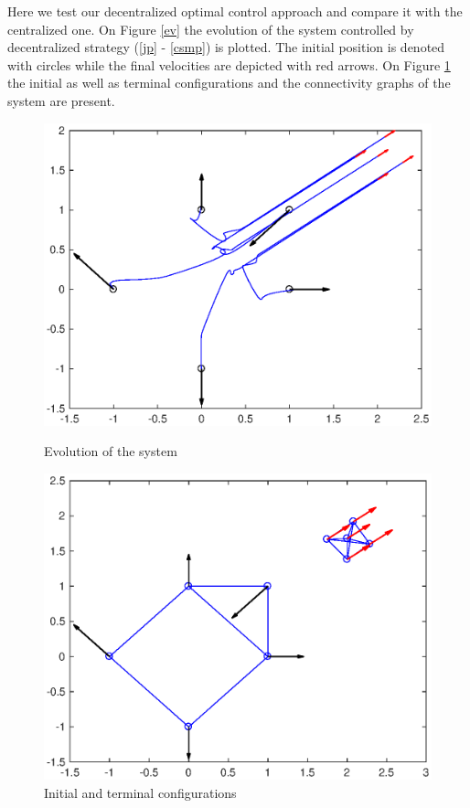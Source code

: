 \documentclass[a4paper,10pt, english]{article}
\begin{document}
Here we test our decentralized optimal control approach and compare it with the centralized one. 
On Figure \ref{ev} the evolution of the system  controlled by decentralized strategy (\ref{jp} - \ref{csmp}) is plotted. The initial position
is denoted with circles while the final velocities are depicted with red arrows. On Figure \ref{g} the initial as well as terminal configurations and the connectivity graphs of the system are present.



\begin{figure}[ht]
  \begin{minipage}[b]{0.5\textwidth}
    \includegraphics[width=\textwidth]{figures/a5_D_ev.eps}
    \caption{Evolution of the system}
    \label{ev}
  \end{minipage}
  \hfill
  \begin{minipage}[b]{0.5\textwidth}
    \includegraphics[width=\textwidth]{figures/a5_D_g.eps}
    \caption{Initial and terminal configurations}
    \label{g}
  \end{minipage}
\end{figure}
\end{document}
